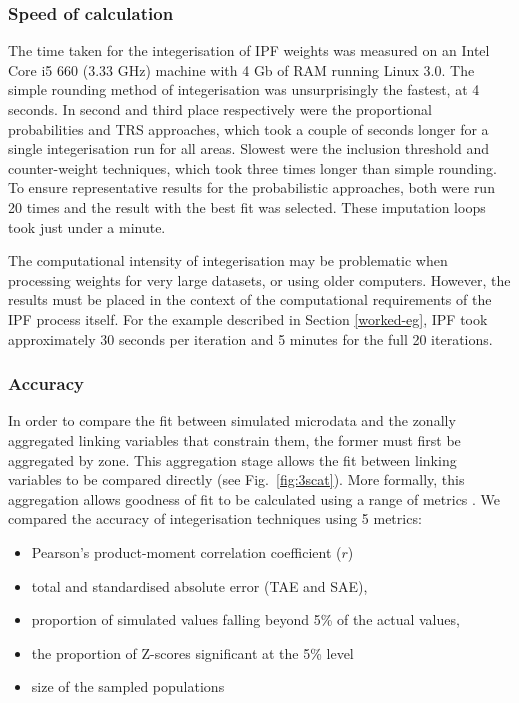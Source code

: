 \documentclass[a4paper, 11pt, twoside]{Thesis}
\begin{document}
\subsubsection{Speed of calculation}
The time taken for the integerisation of IPF weights was measured on an Intel
Core i5 660 (3.33 GHz) machine with 4 Gb of RAM running Linux 3.0.
The simple rounding method of integerisation was unsurprisingly the fastest, at
4 seconds. 
In second and third place respectively were the proportional probabilities
and TRS approaches, which took a couple of seconds longer for a single
integerisation run for all areas.
Slowest were the inclusion threshold and counter-weight techniques, which took
three times longer than simple rounding. To ensure representative results for
the probabilistic approaches, both were run 20 times and the result with the
best fit was selected. These imputation loops took just under a minute.

The computational intensity of integerisation may
be problematic when processing weights for very large
datasets, or using older computers. However, the results must be placed in
the context of the computational requirements of the IPF process itself. For the
example described in Section \ref{worked-eg}, IPF took approximately
30 seconds per iteration and 5 minutes for the full 20 iterations.

\subsubsection{Accuracy}
In order to compare the fit between simulated microdata and the zonally
aggregated linking variables that constrain them, the former must first be
aggregated by zone. This aggregation stage allows the fit between linking
variables to be compared directly (see Fig.~\ref{fig:3scat}). More
formally, this aggregation allows goodness of fit to be calculated using a range
of metrics \citep{Williamson1998}. We compared the accuracy of integerisation
techniques using 5 metrics:
\begin{itemize}
\item Pearson's product-moment correlation coefficient ($r$)
\item total and standardised absolute error (TAE and SAE),
\item proportion of simulated values falling beyond 5\% of the actual values,
\item the proportion of Z-scores significant at the 5\% level
\item size of the sampled populations
\end{itemize}
\end{document}
